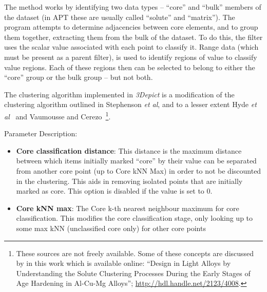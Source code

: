\documentclass[10pt]{article}
\begin{document}
The method works by identifying two data types -- ``core'' and ``bulk'' members of the dataset (in APT these are usually called ``solute'' and ``matrix''). The program attempts to determine adjacencies between core elements, and to group them together, extracting them from the bulk of the dataset. To do this, the filter uses the scalar value associated with each point to classify it. Range data (which must be present as a parent filter), is used to identify regions of value to classify value regions. Each of these regions then can be selected to belong to either the ``core'' group or the bulk group -- but not both.

The clustering algorithm implemented in \emph{3Depict} is a modification of the clustering algorithm outlined in Stephenson \emph{et al}\cite{Stephenson07}, and to a lesser extent Hyde \emph{et al}~\cite{Hyde10} and Vaumousse and Cerezo~\cite{Vaumousse03}\footnote{These sources are not freely available. Some of these concepts are discussed by in this work which is available online: ``Design in Light Alloys by Understanding the Solute Clustering Processes During the Early Stages of Age Hardening in Al-Cu-Mg Alloys''; \url{http://hdl.handle.net/2123/4008}.}.  


Parameter Description:
\begin{itemize}
 \item \textbf{Core classification distance}: This distance is the maximum distance between which items initially marked ``core'' by their value can be separated from another core point (up to Core kNN Max) in order to not be discounted in the clustering. This aids in removing isolated points that are initially marked as core. This option is disabled if the value is set to 0.
 \item \textbf{Core kNN max}: The Core k-th nearest neighbour maximum for core classification. This modifies the core classification stage, only looking up to some max kNN (unclassified core only) for other core points
\end{itemize}
\end{document}
